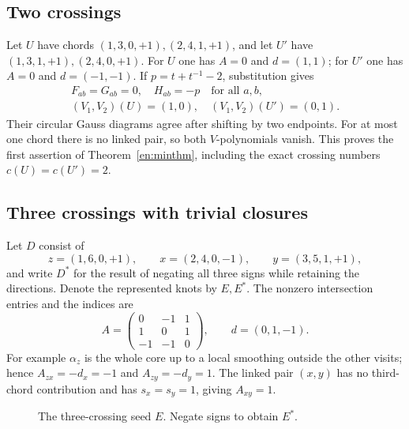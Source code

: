 \documentclass[12pt]{amsart}
\theoremstyle{definition}
\theoremstyle{remark}
\numberwithin{equation}{section}
\begin{document}
\subsection{Two crossings}
Let $U$ have chords $(1,3,0,+1),(2,4,1,+1)$, and let $U'$ have
$(1,3,1,+1),(2,4,0,+1)$. For $U$ one has $A=0$ and $d=(1,1)$;
for $U'$ one has $A=0$ and $d=(-1,-1)$. If $p=t+t^{-1}-2$, substitution gives
\begin{equation}\label{en:two}
\begin{gathered}
F_{ab}=G_{ab}=0,\quad H_{ab}=-p\quad\text{for all }a,b,\\
(V_1,V_2)(U)=(1,0),\quad(V_1,V_2)(U')=(0,1).
\end{gathered}
\end{equation}
Their circular Gauss diagrams agree after shifting by two endpoints.
For at most one chord there is no linked pair, so both $V$-polynomials
vanish. This proves the first assertion of Theorem~\ref{en:minthm},
including the exact crossing numbers $c(U)=c(U')=2$.

\subsection{Three crossings with trivial closures}
Let $D$ consist of
\begin{equation}\label{en:seed}
z=(1,6,0,+1),\qquad x=(2,4,0,-1),\qquad y=(3,5,1,+1),
\end{equation}
and write $D^*$ for the result of negating all three signs while retaining
the directions. Denote the represented knots by $E,E^*$.
The nonzero intersection entries and the indices are
\begin{equation}\label{en:seedmatrix}
A=\begin{pmatrix}0&-1&1\\1&0&1\\-1&-1&0\end{pmatrix},
\qquad d=(0,1,-1).
\end{equation}
For example $\alpha_z$ is the whole core up to a local smoothing outside
the other visits; hence $A_{zx}=-d_x=-1$ and $A_{zy}=-d_y=1$.
The linked pair $(x,y)$ has no third-chord contribution and has
$s_x=s_y=1$, giving $A_{xy}=1$.

\begin{figure}[ht]
\centering
{}
\caption{The three-crossing seed $E$. Negate signs to obtain $E^*$.}
\end{figure}
\end{document}
